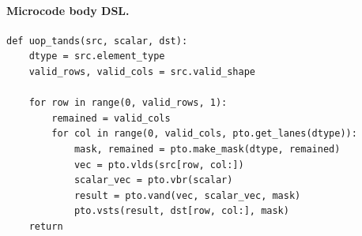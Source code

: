 \paragraph{Microcode body DSL.}
\begin{lstlisting}[style=ptocode]
def uop_tands(src, scalar, dst):
    dtype = src.element_type
    valid_rows, valid_cols = src.valid_shape

    for row in range(0, valid_rows, 1):
        remained = valid_cols
        for col in range(0, valid_cols, pto.get_lanes(dtype)):
            mask, remained = pto.make_mask(dtype, remained)
            vec = pto.vlds(src[row, col:])
            scalar_vec = pto.vbr(scalar)
            result = pto.vand(vec, scalar_vec, mask)
            pto.vsts(result, dst[row, col:], mask)
    return
\end{lstlisting}
\Needspace{0.34\textheight}

